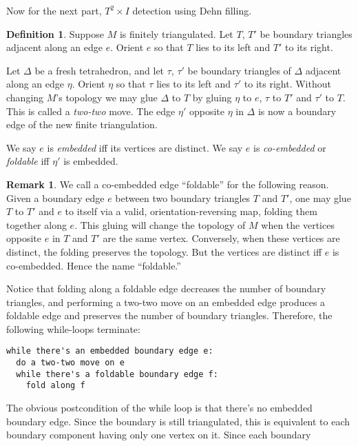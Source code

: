 \documentclass[10pt,twocolumn]{article}%
\theoremstyle{definition}
\newtheorem{Def}[Thm]{Definition}
\newtheorem{Rmk}[Thm]{Remark}
\begin{document}
\nwendcode{}\nwdocspar
Now for the next part,
$T^2 \times I$ detection
using Dehn filling.
\begin{Def}
Suppose $M$ is finitely triangulated. Let $T$, $T'$
be boundary triangles adjacent along an edge $e$.
Orient $e$ so that $T$ lies to its left
and $T'$ to its right. 

Let $\Delta$ be a fresh tetrahedron, 
and let $\tau$, $\tau'$
be boundary triangles of $\Delta$ adjacent
along an edge $\eta$. Orient $\eta$ so that
$\tau$ lies to its left and $\tau'$ to its right.
Without changing $M$'s topology we may glue
$\Delta$ to $T$ by gluing $\eta$ to $e$, 
$\tau$ to $T'$ and $\tau'$ to $T$. This is
called a \emph{two-two} move. 
The edge $\eta'$ opposite
$\eta$ in $\Delta$ is now a boundary edge of the
new finite triangulation.

We say $e$ is \emph{embedded} iff its
vertices are distinct. We say $e$ is
\emph{co-embedded} or \emph{foldable}
iff $\eta'$ is embedded.
\end{Def}
\nwenddocs{}\nwdocspar
\begin{Rmk}
We call a co-embedded edge ``foldable'' for the
following reason. Given a boundary edge $e$ between
two boundary triangles $T$ and $T'$, one may
glue $T$ to $T'$ and $e$ to itself via a valid,
orientation-reversing map, 
folding them together along $e$.
This gluing will change the topology
of $M$ when the vertices opposite $e$ in $T$ and
$T'$ are the same vertex. Conversely, when these
vertices are distinct, the folding 
preserves the topology.
But the vertices are distinct 
iff $e$ is co-embedded.
Hence the name ``foldable.''
\end{Rmk}
\nwenddocs{}\nwdocspar
Notice that folding along a foldable edge
decreases the number of boundary triangles,
and performing a two-two move on an embedded
edge produces a foldable edge and preserves
the number of boundary triangles. Therefore,
the following {\Tt{}while\nwendquote}-loops terminate:
\nwenddocs{}\nwdocspar
\begin{verbatim}
while there's an embedded boundary edge e:
  do a two-two move on e
  while there's a foldable boundary edge f:
    fold along f
\end{verbatim}
\nwenddocs{}\nwdocspar
The obvious postcondition of the {\Tt{}while\nwendquote}
loop is that there's no embedded boundary
edge. Since the boundary is still triangulated,
this is equivalent to each boundary component having
only one vertex on it. Since each boundary
\end{document}
